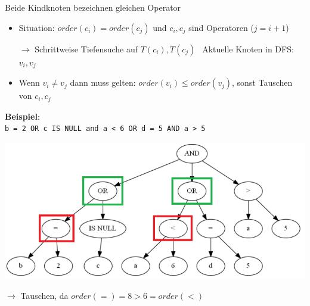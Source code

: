 \documentclass{beamer}
\begin{document}
\begin{frame}[fragile]{Beide Kindknoten bezeichnen gleichen Operator}
\begin{itemize}
\item Situation: $order(c_i) = order(c_j)$ und $c_i,c_j$ sind Operatoren ($j = i + 1$)
\item[$\to$] Schrittweise Tiefensuche auf $T(c_i), T(c_j)\ \ $ Aktuelle Knoten in DFS: $v_i,v_j$
\item Wenn $v_i \neq v_j$ dann muss gelten: $order(v_i) \leq order(v_j)$, sonst Tauschen von $c_i,c_j$
\end{itemize}
\textbf{Beispiel}:\\

\verb|b = 2 OR c IS NULL and a < 6 OR d = 5 AND a > 5|
\begin{center}
\includegraphics[scale=0.27]{sort_step2.png}
\end{center}

$\to$ Tauschen, da $order(=) = 8 > 6 = order(<) $\\
\end{frame}

%
\end{document}
